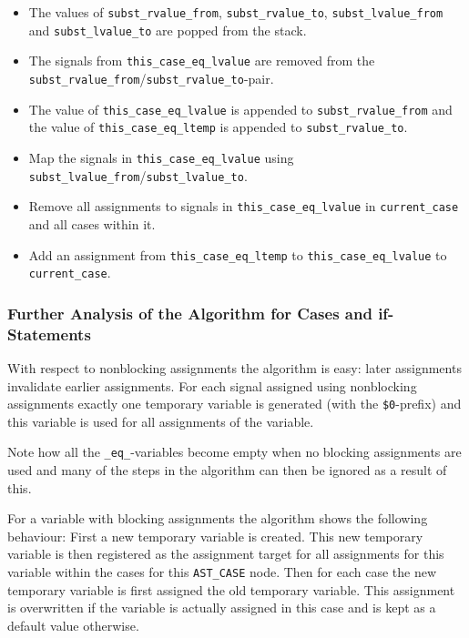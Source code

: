 \begin{sloppypar}
\begin{itemize}
\item The values of \lstinline[language=C++]{subst_rvalue_from}, \lstinline[language=C++]{subst_rvalue_to},
\lstinline[language=C++]{subst_lvalue_from} and \lstinline[language=C++]{subst_lvalue_to} are popped from the stack.
%
\item The signals from \lstinline[language=C++]{this_case_eq_lvalue} are removed from the
\lstinline[language=C++]{subst_rvalue_from}/\lstinline[language=C++]{subst_rvalue_to}-pair.
%
\item The value of \lstinline[language=C++]{this_case_eq_lvalue} is appended to \lstinline[language=C++]{subst_rvalue_from}
and the value of \lstinline[language=C++]{this_case_eq_ltemp} is appended to \lstinline[language=C++]{subst_rvalue_to}.
%
\item Map the signals in \lstinline[language=C++]{this_case_eq_lvalue} using
\lstinline[language=C++]{subst_lvalue_from}/\lstinline[language=C++]{subst_lvalue_to}.
%
\item Remove all assignments to signals in \lstinline[language=C++]{this_case_eq_lvalue} in \lstinline[language=C++]{current_case}
and all cases within it.
%
\item Add an assignment from \lstinline[language=C++]{this_case_eq_ltemp} to \lstinline[language=C++]{this_case_eq_lvalue}
to \lstinline[language=C++]{current_case}.
\end{itemize}
\end{sloppypar}

\subsubsection{Further Analysis of the Algorithm for Cases and if-Statements}

With respect to nonblocking assignments the algorithm is easy: later assignments invalidate earlier assignments.
For each signal assigned using nonblocking assignments exactly one temporary variable is generated (with the
{\tt \$0}-prefix) and this variable is used for all assignments of the variable.

Note how all the \lstinline[language=C++]{_eq_}-variables become empty when no blocking assignments are used
and many of the steps in the algorithm can then be ignored as a result of this.

For a variable with blocking assignments the algorithm shows the following behaviour: First a new temporary variable
is created. This new temporary variable is then registered as the assignment target for all assignments for this
variable within the cases for this {\tt AST\_CASE} node. Then for each case the new temporary variable is first
assigned the old temporary variable. This assignment is overwritten if the variable is actually assigned in this
case and is kept as a default value otherwise.

